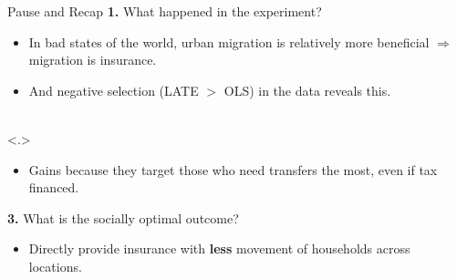 \documentclass[9pt,pdftex,aspectratio=1610]{beamer}
\theoremstyle{definition}
\begin{document}
\begin{frame}[t]{Pause and Recap}
\textbf{1.} What happened in the experiment?
\begin{itemize}
\smallskip
\item In bad states of the world, urban migration is relatively more beneficial $\Rightarrow$ migration is insurance.
\smallskip
\item And negative selection (LATE $>$ OLS) in the data reveals this.
\end{itemize}
\bigskip
{} \\
\uncover<.>{
\begin{itemize}
\smallskip
\item Gains because they target those who need transfers the most, even if tax financed.
\smallskip
\end{itemize}
\bigskip
\textbf{3.} What is the socially optimal outcome? \\
\begin{itemize}
\item Directly provide insurance with \textbf{less} movement of households across locations.
\smallskip
\end{itemize}}
\end{frame}
\end{document}
